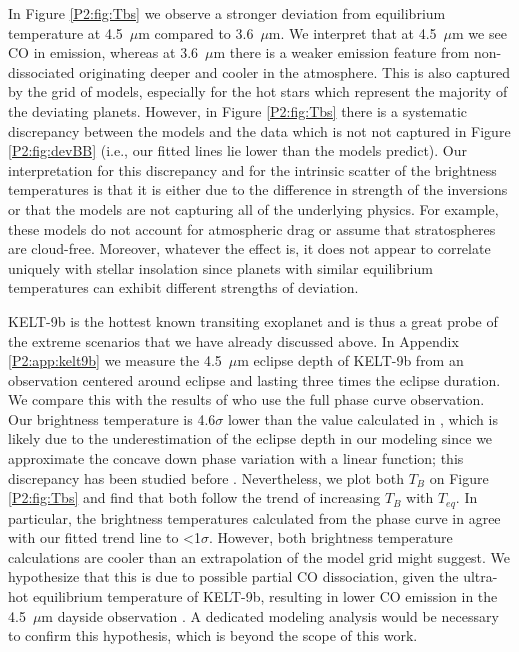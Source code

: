 In Figure \ref{P2:fig:Tbs} we observe a stronger deviation from equilibrium temperature at 4.5~$\mu$m compared to 3.6~$\mu$m. We interpret that at 4.5~$\mu$m we see CO in emission, whereas at 3.6~$\mu$m there is a weaker emission feature from non-dissociated  originating deeper and cooler in the atmosphere. This is also captured by the grid of models, especially for the hot stars which represent the majority of the deviating planets. However, in Figure \ref{P2:fig:Tbs} there is a systematic discrepancy between the models and the data which is not not captured in Figure \ref{P2:fig:devBB} (i.e., our fitted lines lie lower than the models predict). Our interpretation for this discrepancy and for the intrinsic scatter of the brightness temperatures is that it is either due to the difference in strength of the inversions or that the models are not capturing all of
the underlying physics. For example, these models do not account for  atmospheric drag \citep[e.g.,][]{Arcangeli2019} or assume that stratospheres are cloud-free. Moreover, whatever the effect is, it does not appear to correlate uniquely with stellar insolation since planets with similar equilibrium temperatures can exhibit different strengths of deviation.

KELT-9b is the hottest known transiting exoplanet and is thus a great probe of the extreme scenarios that we have already discussed above. In Appendix \ref{P2:app:kelt9b} we measure the 4.5~$\mu$m eclipse depth of KELT-9b from an observation centered around eclipse and lasting three times the eclipse duration. We compare this with the results of \citet{Mansfield2020} who use the full phase curve observation. Our brightness temperature is 4.6$\sigma$ lower than the value calculated in \citet{Mansfield2020}, which is likely due to the underestimation of the eclipse depth in our modeling since we approximate the concave down phase variation with a linear function; this discrepancy has been studied before \citep[e.g.,][]{Bell2019}. Nevertheless, we plot both $T_B$ on Figure \ref{P2:fig:Tbs} and find that both follow the trend of increasing $T_B$ with $T_{eq}$. In particular, the brightness temperatures calculated from the phase curve in \citet{Mansfield2020} agree with our fitted trend line to <1$\sigma$. However, both brightness temperature calculations are cooler than an extrapolation of the model grid might suggest.  We hypothesize that this is due to possible partial CO dissociation, given the ultra-hot equilibrium temperature of KELT-9b, resulting in lower CO emission in the 4.5~$\mu$m dayside observation \citep[e.g.,][]{Kitzmann2018, Lothringer2018}. A dedicated modeling analysis would be necessary to confirm this hypothesis, which is beyond the scope of this work.

